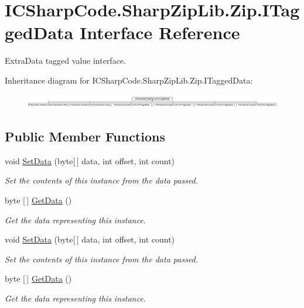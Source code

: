 \hypertarget{interface_i_c_sharp_code_1_1_sharp_zip_lib_1_1_zip_1_1_i_tagged_data}{}\section{I\+C\+Sharp\+Code.\+Sharp\+Zip\+Lib.\+Zip.\+I\+Tagged\+Data Interface Reference}
\label{interface_i_c_sharp_code_1_1_sharp_zip_lib_1_1_zip_1_1_i_tagged_data}


Extra\+Data tagged value interface.  


Inheritance diagram for I\+C\+Sharp\+Code.\+Sharp\+Zip\+Lib.\+Zip.\+I\+Tagged\+Data\+:\begin{figure}[H]
\begin{center}
\leavevmode
\includegraphics[height=0.624303cm]{interface_i_c_sharp_code_1_1_sharp_zip_lib_1_1_zip_1_1_i_tagged_data}
\end{center}
\end{figure}
\subsection*{Public Member Functions}
\begin{DoxyCompactItemize}
\item 
void \hyperlink{interface_i_c_sharp_code_1_1_sharp_zip_lib_1_1_zip_1_1_i_tagged_data_a1d13a64f1fcc5caf769fe96d8fc8561a}{Set\+Data} (byte\mbox{[}$\,$\mbox{]} data, int offset, int count)
\begin{DoxyCompactList}\small\item\em Set the contents of this instance from the data passed. \end{DoxyCompactList}\item 
byte \mbox{[}$\,$\mbox{]} \hyperlink{interface_i_c_sharp_code_1_1_sharp_zip_lib_1_1_zip_1_1_i_tagged_data_a1534d99dec9f2bc6652875e66fba50e6}{Get\+Data} ()
\begin{DoxyCompactList}\small\item\em Get the data representing this instance. \end{DoxyCompactList}\item 
void \hyperlink{interface_i_c_sharp_code_1_1_sharp_zip_lib_1_1_zip_1_1_i_tagged_data_a1d13a64f1fcc5caf769fe96d8fc8561a}{Set\+Data} (byte\mbox{[}$\,$\mbox{]} data, int offset, int count)
\begin{DoxyCompactList}\small\item\em Set the contents of this instance from the data passed. \end{DoxyCompactList}\item 
byte \mbox{[}$\,$\mbox{]} \hyperlink{interface_i_c_sharp_code_1_1_sharp_zip_lib_1_1_zip_1_1_i_tagged_data_a1534d99dec9f2bc6652875e66fba50e6}{Get\+Data} ()
\begin{DoxyCompactList}\small\item\em Get the data representing this instance. \end{DoxyCompactList}\end{DoxyCompactItemize}
